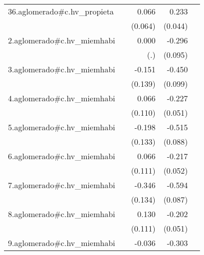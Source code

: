 {\begin{longtable}{l*{4}{D{.}{.}{-1}}}
\addlinespace
36.aglomerado#c.hv\_propieta&                     &       0.066         &       0.233\sym{***}&                     \\
            &                     &     (0.064)         &     (0.044)         &                     \\
\addlinespace
2.aglomerado#c.hv\_miemhabi&                     &       0.000         &      -0.296\sym{**} &                     \\
            &                     &         (.)         &     (0.095)         &                     \\
\addlinespace
3.aglomerado#c.hv\_miemhabi&                     &      -0.151         &      -0.450\sym{***}&                     \\
            &                     &     (0.139)         &     (0.099)         &                     \\
\addlinespace
4.aglomerado#c.hv\_miemhabi&                     &       0.066         &      -0.227\sym{***}&                     \\
            &                     &     (0.110)         &     (0.051)         &                     \\
\addlinespace
5.aglomerado#c.hv\_miemhabi&                     &      -0.198         &      -0.515\sym{***}&                     \\
            &                     &     (0.133)         &     (0.088)         &                     \\
\addlinespace
6.aglomerado#c.hv\_miemhabi&                     &       0.066         &      -0.217\sym{***}&                     \\
            &                     &     (0.111)         &     (0.052)         &                     \\
\addlinespace
7.aglomerado#c.hv\_miemhabi&                     &      -0.346\sym{**} &      -0.594\sym{***}&                     \\
            &                     &     (0.134)         &     (0.087)         &                     \\
\addlinespace
8.aglomerado#c.hv\_miemhabi&                     &       0.130         &      -0.202\sym{***}&                     \\
            &                     &     (0.111)         &     (0.051)         &                     \\
\addlinespace
9.aglomerado#c.hv\_miemhabi&                     &      -0.036         &      -0.303\sym{***}&                     \\

\end{longtable}}
